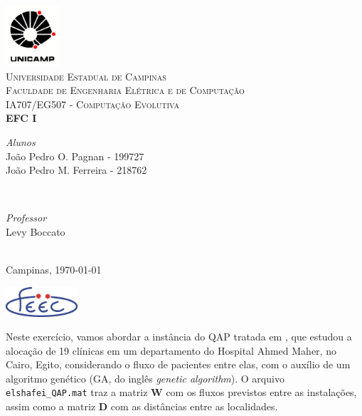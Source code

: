 \documentclass[a4paper, 12pt]{article}
\begin{document}
\begin{titlepage}
\newcommand{\HRule}{\rule{\linewidth}{0.5mm}}
	
\centering

\includegraphics[width=0.15\textwidth]{logo-unicamp.pdf}\\[0.5cm]	
\textsc{\Large Universidade Estadual de Campinas}\\[2.0cm]
\textsc{\large Faculdade de Engenharia Elétrica e de Computação}\\[0.5cm]
	
\textsc{IA707/EG507 - Computação Evolutiva}\\[2.5cm]
	
{\LARGE \bfseries EFC I}\\[3.5cm]

\begin{minipage}[t]{0.4\textwidth}
	\begin{flushleft}
    \textit{Alunos}\\
    João Pedro O. Pagnan - 199727\\
    João Pedro M. Ferreira - 218762
	\end{flushleft}
\end{minipage}
~
\begin{minipage}[t]{0.4\textwidth}
	\begin{flushright}
		\textit{Professor}\\
		Levy Boccato
	\end{flushright}
\end{minipage}\\[4.5cm]

{Campinas, \today}
	
\vfill\vfill\vfill\vfill\vfill

\includegraphics[width=0.2\textwidth]{logo-feec.png}\\[0.5cm]
\vfill 
	
\end{titlepage}

\justify

Neste exercício, vamos abordar a instância do QAP tratada em \cite{elshafei1977hospital}, que estudou a alocação de 19 clínicas em um departamento do Hospital Ahmed Maher, no Cairo, Egito, considerando o fluxo de pacientes entre elas, com o auxílio de um algoritmo genético (GA, do inglês \textit{genetic algorithm}). O arquivo \verb|elshafei_QAP.mat| traz a matriz $\mathbf{W}$ com os fluxos previstos entre as instalações, assim como a matriz $\mathbf{D}$ com as distâncias entre as localidades.
\end{document}
